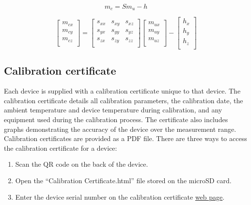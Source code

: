 \begin{equation}
\label{eq:magnetometer}
m_c = S m_u - h
\end{equation}

\begin{equation}
\label{eq:magnetometerExpanded}
    \begin{bmatrix}
        m_{cx}\\
        m_{cy}\\
        m_{cz}\\
    \end{bmatrix}
    =
    \begin{bmatrix}
        s_{xx} & s_{xy} & s_{xz}\\
        s_{yx} & s_{yy} & s_{yz}\\
        s_{zx} & s_{zy} & s_{zz}\\
    \end{bmatrix}
    \begin{bmatrix}
        m_{ux}\\
        m_{uy}\\
        m_{uz}\\
    \end{bmatrix}
    -
    \begin{bmatrix}
        h_{x}\\
        h_{y}\\
        h_{z}\\
    \end{bmatrix}
\end{equation}

\subsection{Calibration certificate}

Each device is supplied with a calibration certificate unique to that device.  The calibration certificate details all calibration parameters, the calibration date, the ambient temperature and device temperature during calibration, and any equipment used during the calibration process.  The certificate also includes graphs demonstrating the accuracy of the device over the measurement range.  Calibration certificates are provided as a \ac{PDF} file.  There are three ways to access the calibration certificate for a device:

\begin{enumerate}[nolistsep]
    \item Scan the \ac{QR} code on the back of the device.
    \item Open the \enquote{Calibration Certificate.html} file stored on the \ac{microSD} card.
    \item Enter the device serial number on the calibration certificate \href{https://x-io.co.uk/calibration-certificate/}{web page}.
\end{enumerate}
